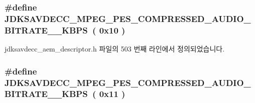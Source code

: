 \subsubsection[{\texorpdfstring{J\+D\+K\+S\+A\+V\+D\+E\+C\+C\+\_\+\+M\+P\+E\+G\+\_\+\+P\+E\+S\+\_\+\+C\+O\+M\+P\+R\+E\+S\+S\+E\+D\+\_\+\+A\+U\+D\+I\+O\+\_\+\+B\+I\+T\+R\+A\+T\+E\+\_\+256\+\_\+\+K\+B\+PS}{JDKSAVDECC_MPEG_PES_COMPRESSED_AUDIO_BITRATE_256_KBPS}}]{\setlength{\rightskip}{0pt plus 5cm}\#define J\+D\+K\+S\+A\+V\+D\+E\+C\+C\+\_\+\+M\+P\+E\+G\+\_\+\+P\+E\+S\+\_\+\+C\+O\+M\+P\+R\+E\+S\+S\+E\+D\+\_\+\+A\+U\+D\+I\+O\+\_\+\+B\+I\+T\+R\+A\+T\+E\+\_\+\_\+\+K\+B\+PS~( 0x10 )}\hypertarget{group__mpeg__pes__compressed__audio__bitrate_gad397138b0fcbd2506252c56ecf3ae081}{}\label{group__mpeg__pes__compressed__audio__bitrate_gad397138b0fcbd2506252c56ecf3ae081}


jdksavdecc\+\_\+aem\+\_\+descriptor.\+h 파일의 503 번째 라인에서 정의되었습니다.

\subsubsection[{\texorpdfstring{J\+D\+K\+S\+A\+V\+D\+E\+C\+C\+\_\+\+M\+P\+E\+G\+\_\+\+P\+E\+S\+\_\+\+C\+O\+M\+P\+R\+E\+S\+S\+E\+D\+\_\+\+A\+U\+D\+I\+O\+\_\+\+B\+I\+T\+R\+A\+T\+E\+\_\+288\+\_\+\+K\+B\+PS}{JDKSAVDECC_MPEG_PES_COMPRESSED_AUDIO_BITRATE_288_KBPS}}]{\setlength{\rightskip}{0pt plus 5cm}\#define J\+D\+K\+S\+A\+V\+D\+E\+C\+C\+\_\+\+M\+P\+E\+G\+\_\+\+P\+E\+S\+\_\+\+C\+O\+M\+P\+R\+E\+S\+S\+E\+D\+\_\+\+A\+U\+D\+I\+O\+\_\+\+B\+I\+T\+R\+A\+T\+E\+\_\+\_\+\+K\+B\+PS~( 0x11 )}\hypertarget{group__mpeg__pes__compressed__audio__bitrate_ga6bbc0bb0b60b761f6a4e2e22977f2ed5}{}\label{group__mpeg__pes__compressed__audio__bitrate_ga6bbc0bb0b60b761f6a4e2e22977f2ed5}


